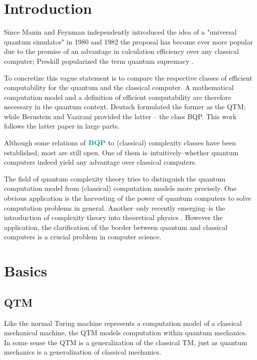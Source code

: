 \section{Introduction}
\label{Introduction}

Since Manin \cite{manin_1980} and Feynman \cite{feynman_1982} independently introduced the idea of a "universal quantum simulator" in 1980 and 1982 the proposal has become ever more popular due to the promise of an advantage in calculation efficiency over any classical computer; Preskill popularized the term quantum supremacy \cite{preskill_2012}.

To concretize this vague statement is to compare the respective classes of efficient computability for the quantum and the classical computer.
A mathematical computation model and a definition of efficient computability are therefore necessary in the quantum context.
Deutsch formulated the former \cite{deutsch_1985} as the \acf{QTM}; while Bernstein and Vazirani provided the latter \cite{bernstein_vazirani_1997} -- the class \ac{BQP}.
This work follows the latter paper in large parts.

Although some relations of $\BQP$ to (classical) complexity classes have been established, most are still open.
One of them is--intuitively--whether quantum computers indeed yield any advantage over classical computers.

The field of quantum complexity theory tries to distinguish the quantum computation model from (classical) computation models more precisely.
One obvious application is the harvesting of the power of quantum computers to solve computation problems in general.
Another--only recently emerging--is the introduction of complexity theory into theoretical physics \cite{susskind_2016}.
However the application, the clarification of the border between quantum and classical computers is a crucial problem in computer science.

\section{Basics}

\subsection{\acl{QTM}}

Like the normal Turing machine represents a computation model of a classical mechanical machine, the \acf{QTM} models computation within quantum mechanics.
In some sense the \ac{QTM} is a generalization of the classical \ac{TM}, just as quantum mechanics is a generalization of classical mechanics.

